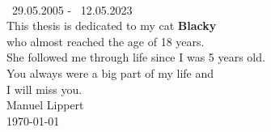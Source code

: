 \NewPage
\thispagestyle{empty}

\begin{center}
    \vspace*{3cm}
    \vspace{2cm}\\
    \gtrsymBorn~29.05.2005 - \gtrsymDied~12.05.2023\\
    \bigskip
    This thesis is dedicated to my cat \textbf{Blacky}\\ who almost reached the age of 18 years.\\ She followed me through life since I was 5 years old.\\You always were a big part of my life and\\ 
    \bigskip
    I will miss you.\\
    \bigskip
    Manuel Lippert\\
    \today
\end{center}
